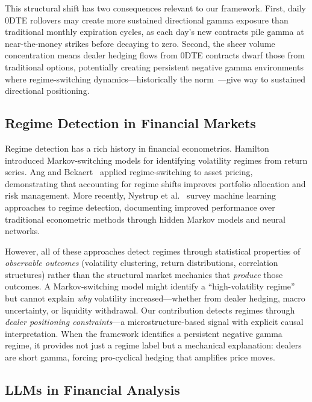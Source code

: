 This structural shift has two consequences relevant to our framework. First, daily 0DTE rollovers may create more sustained directional gamma exposure than traditional monthly expiration cycles, as each day's new contracts pile gamma at near-the-money strikes before decaying to zero. Second, the sheer volume concentration means dealer hedging flows from 0DTE contracts dwarf those from traditional options, potentially creating persistent negative gamma environments where regime-switching dynamics---historically the norm~\cite{ni2005stock}---give way to sustained directional positioning.

\subsection{Regime Detection in Financial Markets}

Regime detection has a rich history in financial econometrics. Hamilton~\cite{hamilton1989new} introduced Markov-switching models for identifying volatility regimes from return series. Ang and Bekaert~\cite{ang2002regime} applied regime-switching to asset pricing, demonstrating that accounting for regime shifts improves portfolio allocation and risk management. More recently, Nystrup et al.~\cite{nystrup2020regime} survey machine learning approaches to regime detection, documenting improved performance over traditional econometric methods through hidden Markov models and neural networks.

However, all of these approaches detect regimes through statistical properties of \textit{observable outcomes} (volatility clustering, return distributions, correlation structures) rather than the structural market mechanics that \textit{produce} those outcomes. A Markov-switching model might identify a ``high-volatility regime'' but cannot explain \textit{why} volatility increased---whether from dealer hedging, macro uncertainty, or liquidity withdrawal. Our contribution detects regimes through \textit{dealer positioning constraints}---a microstructure-based signal with explicit causal interpretation. When the framework identifies a persistent negative gamma regime, it provides not just a regime label but a mechanical explanation: dealers are short gamma, forcing pro-cyclical hedging that amplifies price moves.

\subsection{LLMs in Financial Analysis}


